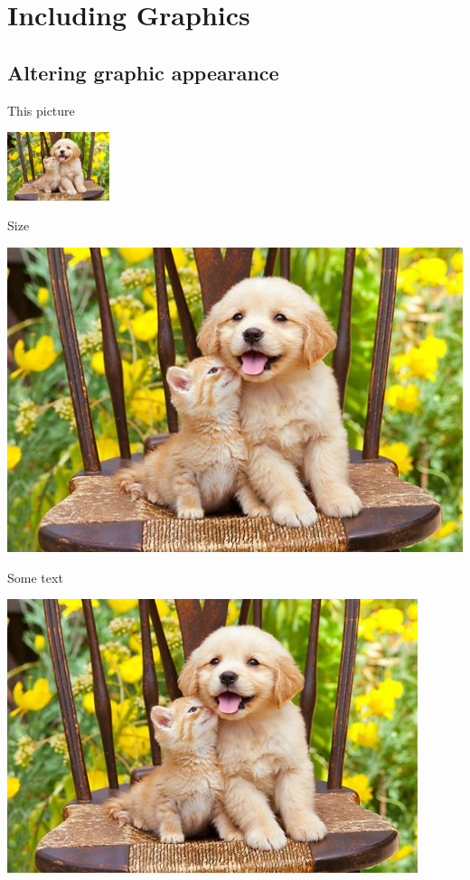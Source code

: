 \documentclass{article}
\begin{document}
\section{Including Graphics}
 \subsection{Altering graphic appearance}
 This picture
 \begin{center}
 \includegraphics[height=2cm]{pic}
 \end{center}
Size


 \begin{center}
 \includegraphics[height = 0.3\textheight]{pic}
 \end{center}
 Some text
 \begin{center}
 \includegraphics[width = 0.9\textwidth]{pic}
 \end{center}
\end{document}
